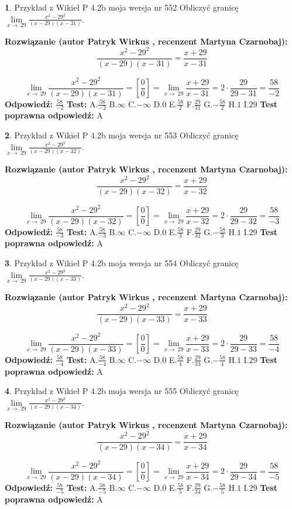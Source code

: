 \documentclass[12pt, a4paper]{article}
\theoremstyle{definition} %
\newtheorem{zad}{}
\newcommand{\zadStart}[1]{\begin{zad}#1\newline}
\newcommand{\zadStop}{\end{zad}}
\newcommand{\rozwStart}[2]{\noindent \textbf{Rozwiązanie (autor #1 , recenzent #2): }\newline}
\newcommand{\rozwStop}{\newline}
\newcommand{\odpStart}{\noindent \textbf{Odpowiedź:}\newline}
\newcommand{\odpStop}{\newline}
\newcommand{\testStart}{\noindent \textbf{Test:}\newline}
\newcommand{\testStop}{\newline}
\newcommand{\kluczStart}{\noindent \textbf{Test poprawna odpowiedź:}\newline}
\newcommand{\kluczStop}{\newline}
\begin{document}
\zadStart{Przykład z Wikieł P 4.2b moja wersja nr 552}
Obliczyć granicę $\lim\limits_{x\to\ 29}\frac{x^{2}-29^{2}}{(x-29)(x-31)}$.
\zadStop
\rozwStart{Patryk Wirkus}{Martyna Czarnobaj}
$$\frac{x^{2}-29^{2}}{(x-29)(x-31)}=\frac{x+29}{x-31}$$

$$\lim\limits_{x\to\ 29}\frac{x^{2}-29^{2}}{(x-29)(x-31)}=[\frac{0}{0}]=\lim\limits_{x\to\ 29}\frac{x+29}{x-31}=2 \cdot \frac{29}{29-31} = \frac{58}{-2}$$
\rozwStop
\odpStart
$\frac{58}{-2}$
\odpStop
\testStart
A.$\frac{58}{-2}$
B.$\infty$
C.$-\infty$
D.$0$
E.$\frac{58}{2}$
F.$\frac{29}{31}$
G.$-\frac{58}{2}$
H.$1$
I.$29$
\testStop
\kluczStart
A
\kluczStop



\zadStart{Przykład z Wikieł P 4.2b moja wersja nr 553}
Obliczyć granicę $\lim\limits_{x\to\ 29}\frac{x^{2}-29^{2}}{(x-29)(x-32)}$.
\zadStop
\rozwStart{Patryk Wirkus}{Martyna Czarnobaj}
$$\frac{x^{2}-29^{2}}{(x-29)(x-32)}=\frac{x+29}{x-32}$$

$$\lim\limits_{x\to\ 29}\frac{x^{2}-29^{2}}{(x-29)(x-32)}=[\frac{0}{0}]=\lim\limits_{x\to\ 29}\frac{x+29}{x-32}=2 \cdot \frac{29}{29-32} = \frac{58}{-3}$$
\rozwStop
\odpStart
$\frac{58}{-3}$
\odpStop
\testStart
A.$\frac{58}{-3}$
B.$\infty$
C.$-\infty$
D.$0$
E.$\frac{58}{3}$
F.$\frac{29}{32}$
G.$-\frac{58}{3}$
H.$1$
I.$29$
\testStop
\kluczStart
A
\kluczStop



\zadStart{Przykład z Wikieł P 4.2b moja wersja nr 554}
Obliczyć granicę $\lim\limits_{x\to\ 29}\frac{x^{2}-29^{2}}{(x-29)(x-33)}$.
\zadStop
\rozwStart{Patryk Wirkus}{Martyna Czarnobaj}
$$\frac{x^{2}-29^{2}}{(x-29)(x-33)}=\frac{x+29}{x-33}$$

$$\lim\limits_{x\to\ 29}\frac{x^{2}-29^{2}}{(x-29)(x-33)}=[\frac{0}{0}]=\lim\limits_{x\to\ 29}\frac{x+29}{x-33}=2 \cdot \frac{29}{29-33} = \frac{58}{-4}$$
\rozwStop
\odpStart
$\frac{58}{-4}$
\odpStop
\testStart
A.$\frac{58}{-4}$
B.$\infty$
C.$-\infty$
D.$0$
E.$\frac{58}{4}$
F.$\frac{29}{33}$
G.$-\frac{58}{4}$
H.$1$
I.$29$
\testStop
\kluczStart
A
\kluczStop



\zadStart{Przykład z Wikieł P 4.2b moja wersja nr 555}
Obliczyć granicę $\lim\limits_{x\to\ 29}\frac{x^{2}-29^{2}}{(x-29)(x-34)}$.
\zadStop
\rozwStart{Patryk Wirkus}{Martyna Czarnobaj}
$$\frac{x^{2}-29^{2}}{(x-29)(x-34)}=\frac{x+29}{x-34}$$

$$\lim\limits_{x\to\ 29}\frac{x^{2}-29^{2}}{(x-29)(x-34)}=[\frac{0}{0}]=\lim\limits_{x\to\ 29}\frac{x+29}{x-34}=2 \cdot \frac{29}{29-34} = \frac{58}{-5}$$
\rozwStop
\odpStart
$\frac{58}{-5}$
\odpStop
\testStart
A.$\frac{58}{-5}$
B.$\infty$
C.$-\infty$
D.$0$
E.$\frac{58}{5}$
F.$\frac{29}{34}$
G.$-\frac{58}{5}$
H.$1$
I.$29$
\testStop
\kluczStart
A
\kluczStop
\end{document}
